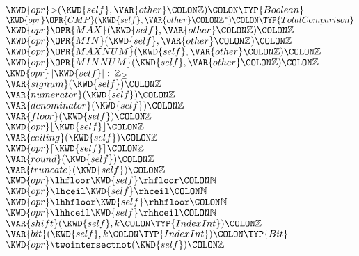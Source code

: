 \begin{Fortress}
\(  \KWD{opr} \mathord{>}(\KWD{self}, \VAR{other}\COLON \mathbb{Z})\COLON \TYP{Boolean}\)\\
\(  \KWD{opr} \mathord{\OPR{CMP}}(\KWD{self}, \VAR{other}\COLON \mathbb{Z}^*)\COLON \TYP{TotalComparison}\)\\
\(  \KWD{opr} \mathord{\OPR{MAX}}(\KWD{self}, \VAR{other}\COLON \mathbb{Z})\COLON \mathbb{Z}\)\\
\(  \KWD{opr} \mathord{\OPR{MIN}}(\KWD{self}, \VAR{other}\COLON \mathbb{Z})\COLON \mathbb{Z}\)\\
\(  \KWD{opr} \mathord{\OPR{MAXNUM}}(\KWD{self}, \VAR{other}\COLON \mathbb{Z})\COLON \mathbb{Z}\)\\
\(  \KWD{opr} \mathord{\OPR{MINNUM}}(\KWD{self}, \VAR{other}\COLON \mathbb{Z})\COLON \mathbb{Z}\)\\
\(  \KWD{opr} \left|\mathord{\KWD{self}}\right| \mathrel{\mathtt{:}}\mskip 4mu plus 4mu\mathbb{Z}_{\geq}\)\\
\(  \VAR{signum}(\KWD{self})\COLON \mathbb{Z}\)\\
\(  \VAR{numerator}(\KWD{self})\COLON \mathbb{Z}\)\\
\(  \VAR{denominator}(\KWD{self})\COLON \mathbb{Z}\)\\
\(  \VAR{floor}(\KWD{self})\COLON \mathbb{Z}\)\\
\(  \KWD{opr} \lfloor \mathord{\KWD{self}} \rfloor\COLON \mathbb{Z}\)\\
\(  \VAR{ceiling}(\KWD{self})\COLON \mathbb{Z}\)\\
\(  \KWD{opr} \lceil \mathord{\KWD{self}} \rceil\COLON \mathbb{Z}\)\\
\(  \VAR{round}(\KWD{self})\COLON \mathbb{Z}\)\\
\(  \VAR{truncate}(\KWD{self})\COLON \mathbb{Z}\)\\
\(  \KWD{opr} \lhfloor \mathord{\KWD{self}} \rhfloor\COLON \mathbb{N}\)\\
\(  \KWD{opr} \lhceil \mathord{\KWD{self}} \rhceil\COLON \mathbb{N}\)\\
\(  \KWD{opr} \lhhfloor \mathord{\KWD{self}} \rhhfloor\COLON \mathbb{N}\)\\
\(  \KWD{opr} \lhhceil \mathord{\KWD{self}} \rhhceil\COLON \mathbb{N}\)\\
\(  \VAR{shift}(\KWD{self}, k\COLON \TYP{IndexInt})\COLON \mathbb{Z}\)\\
\(  \VAR{bit}(\KWD{self}, k\COLON \TYP{IndexInt})\COLON \TYP{Bit}\)\\
\(  \KWD{opr} \mathord{\twointersectnot}(\KWD{self})\COLON \mathbb{Z}\)\\

\end{Fortress}
